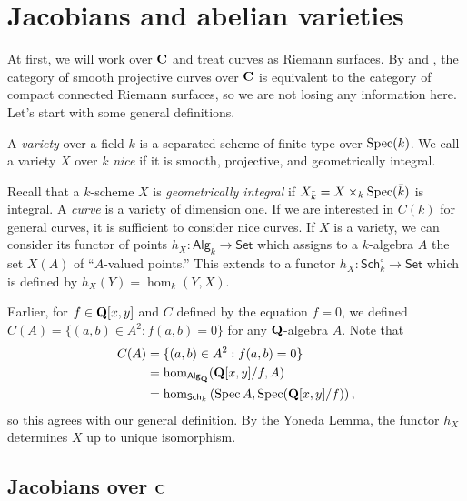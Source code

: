 




\section{Jacobians and abelian varieties}





At first, we will work over $\mathbf{C}$ and treat curves as Riemann surfaces. By 
\cite[I.6.12]{ha77} and \cite[5.8.7]{jo06}, 
the category of smooth projective curves over $\mathbf{C}$ is equivalent to the 
category of compact connected Riemann surfaces, so we are not losing any 
information here. Let's start with some general definitions.

\begin{definition}
A \emph{variety} over a field $k$ is a separated scheme of finite type over 
$\operatorname{Spec}(k)$. We call a variety $X$ over $k$ \emph{nice} if it is smooth, projective, 
and geometrically integral.
\end{definition}

Recall that a $k$-scheme $X$ is \emph{geometrically integral} if 
$X_{\bar k}=X\times_k \operatorname{Spec}(\bar k)$ is integral. A \emph{curve} is a 
variety of dimension one. If we are interested in $C(k)$ for general curves, 
it is sufficient to consider nice curves. If $X$ is a variety, we can consider 
its functor of points $h_X:\mathsf{Alg}_k\to \mathsf{Set}$ which assigns to a 
$k$-algebra $A$ the set $X(A)$ of ``$A$-valued points.'' This extends to a 
functor $h_X:\mathsf{Sch}_k^\circ\to\mathsf{Set}$ which is defined by 
$h_X(Y)=\hom_k(Y,X)$. 

Earlier, for $f\in \mathbf{Q}[x,y]$ and $C$ defined by the equation $f=0$, we 
defined $C(A)=\{(a,b)\in A^2:f(a,b)=0\}$ for any $\mathbf{Q}$-algebra $A$. 
Note that 
\begin{align*}
  C(A) &= \{(a,b)\in A^2:f(a,b) = 0\} \\
    &= \hom_{\mathsf{Alg}_{\mathbf{Q}}}(\mathbf{Q}[x,y]/f,A) \\
    &= \hom_{\mathsf{Sch}_k}\left(\operatorname{Spec} A,\operatorname{Spec}(\mathbf{Q}[x,y]/f)\right) ,
\end{align*}
so this agrees with our general definition. By the Yoneda Lemma, the functor 
$h_X$ determines $X$ up to unique isomorphism. 






\subsection{Jacobians over \texorpdfstring{$\mathbf{C}$}{C}}

